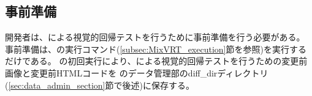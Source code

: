 \subsection{事前準備}\label{subsec:MixVRT_preparation}
開発者は、\toolName による視覚的回帰テストを行うために事前準備を行う必要がある。
事前準備は、\toolName の実行コマンド(\ref{subsec:MixVRT_execution}節を参照)を実行するだけである。
\toolName の初回実行により、\toolName による視覚的回帰テストを行うための変更前画像と変更前HTMLコードを
\toolName のデータ管理部のdiff\_dirディレクトリ(\ref{sec:data_admin_section}節で後述)に保存する。
